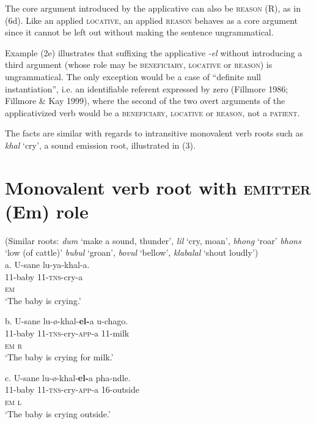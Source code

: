 \documentclass[output=paper]{langsci/langscibook}
\begin{document}
  The core argument introduced by the applicative can also be \textsc{reason} (R), as in (6d). Like an applied \textsc{locative}, an applied \textsc{reason} behaves as a core argument since it cannot be left out without making the sentence ungrammatical. 

  Example (2e) illustrates that suffixing the applicative \textit{{}-el} without introducing a third argument (whose role may be \textsc{beneficiary}, \textsc{locative} or \textsc{reason}) is ungrammatical. The only exception would be a case of “definite null instantiation”, i.e. an identifiable referent expressed by zero (Fillmore 1986; Fillmore \& Kay 1999), where the second of the two overt arguments of the applicativized verb would be a \textsc{beneficiary}, \textsc{locative} or \textsc{reason}, not a \textsc{patient}.

  The facts are similar with regards to intransitive monovalent verb roots such as \textit{khal} ‘cry’, a sound emission root, illustrated in (3). 

\chapter[Monovalent verb root with emitter (Em) role]{Monovalent verb root with \textsc{emitter} (Em) role}
     (Similar roots: \textit{dum} ‘make a sound, thunder’, \textit{lil }‘cry, moan’, \textit{bhong} ‘roar’ \textit{bhons} ‘low (of cattle)’ \textit{bubul} ‘groan’, \textit{bovul} ‘bellow’, \textit{klabalal} ‘shout loudly’)\\
\gll   a.    U-sane    lu-ya-khal-a.\\
         11-baby      11-\textsc{tns}{}-cry-a   \\
         \textsc{em}\\
\glt     ‘The baby is crying.’
\z

\gll   b.   U-sane   lu-ø-khal-\textbf{el-}a       u-chago. \\
         11-baby     11-\textsc{tns}{}-cry-\textsc{app}{}-a    11-milk\\
         \textsc{em                       r}\\
\glt     ‘The baby is crying for milk.’ 
\z

\gll   c.   U-sane     lu-ø-khal-\textbf{el-}a          pha-ndle.\\
         11-baby      11-\textsc{tns}{}-cry-\textsc{app}{}-a    16-outside\\
         \textsc{em                          l}\\
\glt     ‘The baby is crying outside.’
\z
\end{document}
